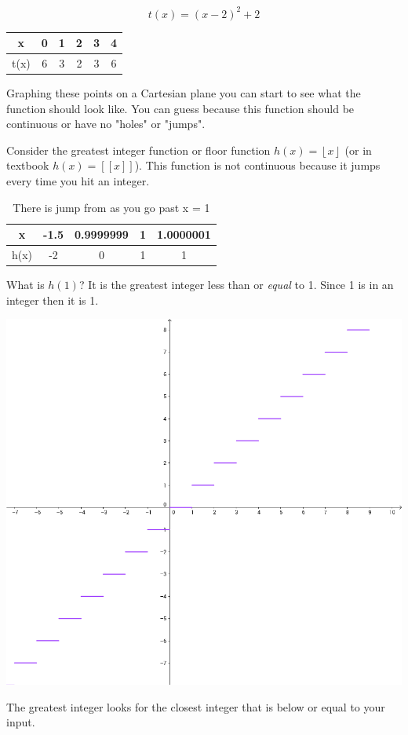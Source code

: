 \documentclass{tufte-handout}
\providecommand{\floor}[1]{\left \lfloor #1 \right \rfloor }
\begin{document}
\[t(x) = (x-2)^2 + 2\]

\begin{table}
\centering
	\begin{tabular}{c || c | c | c | c | c}
		x & 0 & 1 & 2 & 3 & 4 \\
		\hline
		t(x) & 6 & 3 & 2 & 3 & 6 \\
	\end{tabular}
\end{table}

Graphing these points on a Cartesian plane you can start to see what the function should look like.  You can guess because this function should be continuous or have no "holes" or "jumps".  

Consider the greatest integer function or floor function $h(x) = \floor{x}$ (or in textbook $h(x) = [[x]]$).  This function is not continuous because it jumps every time you hit an integer.

\begin{table}
	\centering
	\begin{tabular}{c || c | c | c | c}
		x & -1.5 & 0.9999999 & 1 & 1.0000001 \\
		\hline
		h(x) & -2 & 0 & 1 & 1 \\
	\end{tabular}
    \caption{There is jump from as you go past x = 1}
\end{table}

What is $h(1)$? It is the greatest integer less than or \textit{equal} to 1.  Since 1 is in an integer then it is 1.

\begin{marginfigure}
	\includegraphics[width=\linewidth]{2-2floor.png}
	\caption{The greatest integer looks for the closest integer that is below or equal to your input.}
    \label{fig:floor}
\end{marginfigure}
\end{document}
